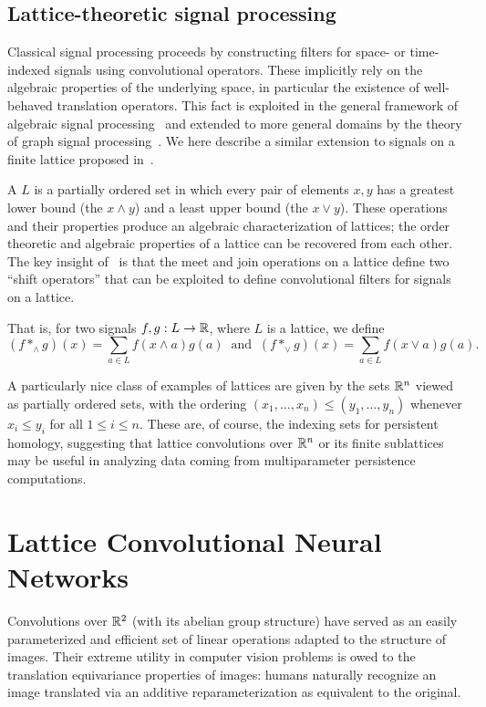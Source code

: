 \documentclass{article}
\begin{document}
\subsection{Lattice-theoretic signal processing}\label{sec:latticeconv}

Classical signal processing proceeds by constructing filters for space- or
time-indexed signals using convolutional operators. These implicitly rely on the
algebraic properties of the underlying space, in particular the existence of
well-behaved translation operators. This fact is exploited in the general
framework of algebraic signal processing~\cite{puschel_algebraic_2008} and
extended to more general domains by the theory of graph signal
processing~\cite{ortega_graph_2018}. We here describe a similar extension to
signals on a finite lattice proposed in~\cite{pueschel_discrete_2019}.

A  $L$ is a partially ordered set in which every pair of
elements $x,y$ has a greatest lower bound (the  $x \wedge y$)
and a least upper bound (the  $x \vee y$). These operations
and their properties produce an algebraic characterization of lattices; the
order theoretic and algebraic properties of a lattice can be recovered from each
other. The key insight of~\cite{pueschel_discrete_2019} is that the meet and
join operations on a lattice define two ``shift operators'' that can be
exploited to define convolutional filters for signals on a lattice.

That is, for two signals $f,g: L \to \mathbb{R}$, where $L$ is a lattice, we define
\[(f *_\wedge g)(x) = \sum_{a \in L}f(x\wedge a)g(a) \;\;\text{and}\;\; (f *_\vee g)(x) = \sum_{a \in L}f(x\vee a)g(a).\]

A particularly nice class of examples of lattices are given by the sets $\mathbb{R}^n$
viewed as partially ordered sets, with the ordering $(x_1,\ldots,x_n) \leq
(y_1,\ldots,y_n)$ whenever $x_i \leq y_i$ for all $1 \leq i \leq n$. These are,
of course, the indexing sets for persistent homology, suggesting that lattice
convolutions over $\mathbb{R}^n$ or its finite sublattices may be useful in analyzing
data coming from multiparameter persistence computations. 


\section{Lattice Convolutional Neural Networks}\label{sec:latticeCNN}

Convolutions over $\mathbb{R}^2$ (with its abelian group structure)
have served as an easily parameterized and efficient set of linear operations
adapted to the structure of images. Their extreme utility in computer vision
problems is owed to the translation equivariance properties of images: humans
naturally recognize an image translated via an additive reparameterization as
equivalent to the original.
\end{document}
